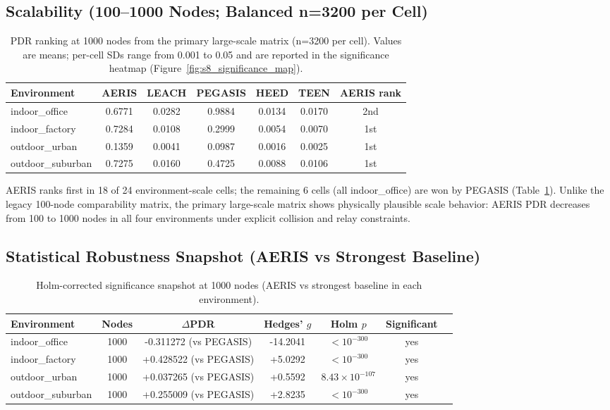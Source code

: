 ﻿\documentclass[sensors,article,submit,moreauthors,pdftex]{Definitions/mdpi}
\begin{document}
\subsection{Scalability (100--1000 Nodes; Balanced n=3200 per Cell)}
\begin{table}[H]
\caption{PDR ranking at 1000 nodes from the primary large-scale matrix (n=3200 per cell). Values are means; per-cell SDs range from 0.001 to 0.05 and are reported in the significance heatmap (Figure~\ref{fig:s8_significance_map}).}
\label{tab:scale1000}
\centering
\begin{tabular}{lcccccc}
\toprule
Environment & AERIS & LEACH & PEGASIS & HEED & TEEN & AERIS rank \\
\midrule
indoor\_office    & 0.6771 & 0.0282 & 0.9884 & 0.0134 & 0.0170 & 2nd \\
indoor\_factory   & 0.7284 & 0.0108 & 0.2999 & 0.0054 & 0.0070 & 1st \\
outdoor\_urban    & 0.1359 & 0.0041 & 0.0987 & 0.0016 & 0.0025 & 1st \\
outdoor\_suburban & 0.7275 & 0.0160 & 0.4725 & 0.0088 & 0.0106 & 1st \\
\bottomrule
\end{tabular}
\end{table}

AERIS ranks first in 18 of 24 environment-scale cells; the remaining 6 cells (all indoor\_office) are won by PEGASIS (Table~\ref{tab:scale1000}).
Unlike the legacy 100-node comparability matrix, the primary large-scale matrix shows physically plausible scale behavior: AERIS PDR decreases from 100 to 1000 nodes in all four environments under explicit collision and relay constraints.

\subsection{Statistical Robustness Snapshot (AERIS vs Strongest Baseline)}
\begin{table}[H]
\caption{Holm-corrected significance snapshot at 1000 nodes (AERIS vs strongest baseline in each environment).}
\label{tab:robust_snapshot}
\centering
\begin{tabular}{lcccccc}
\toprule
Environment & Nodes & $\Delta$PDR & Hedges' $g$ & Holm $p$ & Significant \\
\midrule
indoor\_office    & 1000 & -0.311272 (vs PEGASIS) & -14.2041 & $<10^{-300}$ & yes \\
indoor\_factory   & 1000 & +0.428522 (vs PEGASIS) & +5.0292 & $<10^{-300}$ & yes \\
outdoor\_urban    & 1000 & +0.037265 (vs PEGASIS) & +0.5592 & $8.43\times10^{-107}$ & yes \\
outdoor\_suburban & 1000 & +0.255009 (vs PEGASIS) & +2.8235 & $<10^{-300}$ & yes \\
\bottomrule
\end{tabular}
\end{table}
\end{document}
